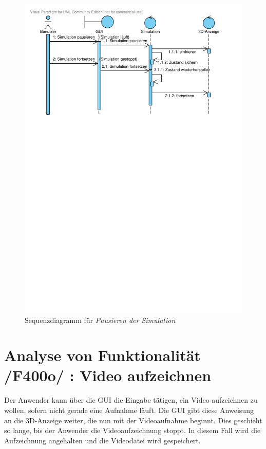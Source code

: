 \begin{figure}[!h]
\includegraphics[viewport = 0 17.5cm 25cm 30cm, width=\linewidth]{bilder/Pausieren.pdf}
\caption{Sequenzdiagramm für \textit{Pausieren der Simulation}}
\end{figure}

\section{Analyse von Funktionalität /F400o/ :  Video aufzeichnen}
Der Anwender kann über die GUI die Eingabe tätigen, ein Video aufzeichnen zu wollen, sofern nicht gerade eine Aufnahme läuft. Die GUI gibt diese Anweisung an die 3D-Anzeige weiter, die nun mit der
Videoaufnahme beginnt. Dies geschieht so lange, bis der Anwender die Videoaufzeichnung stoppt. In diesem Fall wird die Aufzeichnung angehalten und die Videodatei wird gespeichert.


